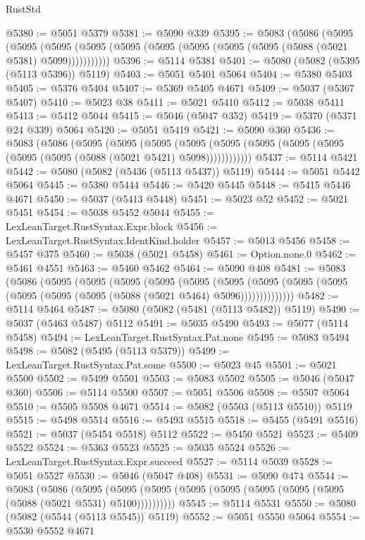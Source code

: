 \begin{lexlean}{RustStd}
\begin{coremodule}
@5380 := @5051 @5379
@5381 := @5090 @339
@5395 := @5083
    (@5086
      (@5095
        (@5095
          (@5095 (@5095 (@5095 (@5095 (@5095 (@5095 (@5095 (@5088 (@5021 @5381) @5099)))))))))))
@5396 := @5114 @5381
@5401 := @5080 (@5082 (@5395 (@5113 @5396)) @5119)
@5403 := @5051 @5401 @5064
@5404 := @5380 @5403
@5405 := @5376 @5404
@5407 := @5369 @5405 @4671
@5409 := @5037 (@5367 @5407)
@5410 := @5023 @38
@5411 := @5021 @5410
@5412 := @5038 @5411
@5413 := @5412 @5044
@5415 := @5046 (@5047 @352)
@5419 := @5370 (@5371 @24 @339) @5064
@5420 := @5051 @5419
@5421 := @5090 @360
@5436 := @5083
    (@5086
      (@5095
        (@5095
          (@5095
            (@5095 (@5095 (@5095 (@5095 (@5095 (@5095 (@5095 (@5088 (@5021 @5421) @5098))))))))))))
@5437 := @5114 @5421
@5442 := @5080 (@5082 (@5436 (@5113 @5437)) @5119)
@5444 := @5051 @5442 @5064
@5445 := @5380 @5444
@5446 := @5420 @5445
@5448 := @5415 @5446 @4671
@5450 := @5037 (@5413 @5448)
@5451 := @5023 @52
@5452 := @5021 @5451
@5454 := @5038 @5452 @5044
@5455 := LexLeanTarget.RustSyntax.Expr.block
@5456 := LexLeanTarget.RustSyntax.IdentKind.holder
@5457 := @5013 @5456
@5458 := @5457 @375
@5460 := @5038 (@5021 @5458)
@5461 := Option.none.{0}
@5462 := @5461 @4551
@5463 := @5460 @5462
@5464 := @5090 @408
@5481 := @5083
    (@5086
      (@5095
        (@5095
          (@5095
            (@5095
              (@5095
                (@5095
                  (@5095 (@5095 (@5095 (@5095 (@5095 (@5095 (@5088 (@5021 @5464) @5096))))))))))))))
@5482 := @5114 @5464
@5487 := @5080 (@5082 (@5481 (@5113 @5482)) @5119)
@5490 := @5037 (@5463 @5487) @5112
@5491 := @5035 @5490
@5493 := @5077 (@5114 @5458)
@5494 := LexLeanTarget.RustSyntax.Pat.none
@5495 := @5083 @5494
@5498 := @5082 (@5495 (@5113 @5379))
@5499 := LexLeanTarget.RustSyntax.Pat.some
@5500 := @5023 @45
@5501 := @5021 @5500
@5502 := @5499 @5501
@5503 := @5083 @5502
@5505 := @5046 (@5047 @360)
@5506 := @5114 @5500
@5507 := @5051 @5506
@5508 := @5507 @5064
@5510 := @5505 @5508 @4671
@5514 := @5082 (@5503 (@5113 @5510)) @5119
@5515 := @5498 @5514
@5516 := @5493 @5515
@5518 := @5455 (@5491 @5516)
@5521 := @5037 (@5454 @5518) @5112
@5522 := @5450 @5521
@5523 := @5409 @5522
@5524 := @5363 @5523
@5525 := @5035 @5524
@5526 := LexLeanTarget.RustSyntax.Expr.succeed
@5527 := @5114 @5039
@5528 := @5051 @5527
@5530 := @5046 (@5047 @408)
@5531 := @5090 @474
@5544 := @5083
    (@5086
      (@5095 (@5095 (@5095 (@5095 (@5095 (@5095 (@5095 (@5095 (@5088 (@5021 @5531) @5100))))))))))
@5545 := @5114 @5531
@5550 := @5080 (@5082 (@5544 (@5113 @5545)) @5119)
@5552 := @5051 @5550 @5064
@5554 := @5530 @5552 @4671

\end{coremodule}
\end{lexlean}
